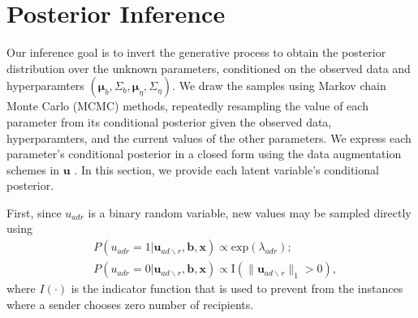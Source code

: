\documentclass[12pt]{article}
\begin{document}
\section{Posterior Inference}\label{sec:inference}
Our inference goal is to invert the generative process to obtain the posterior distribution over the unknown parameters, conditioned on the observed data and hyperparamters $(\boldsymbol{\mu}_b, \Sigma_b, \boldsymbol{\mu}_\eta, \Sigma_\eta)$. We draw the samples using Markov chain Monte Carlo (MCMC) methods, repeatedly resampling the value of each parameter from its conditional posterior given the observed data, hyperparamters, and the current values of the other parameters. We express each parameter’s conditional posterior in a closed form using the data augmentation schemes in $\boldsymbol{u}$ \cite{tanner1987calculation}. In this section, we provide each latent variable's conditional posterior. 

First, since $u_{adr}$ is a binary random variable, new values may be sampled directly using
\begin{equation}
\begin{aligned}
&P(u_{adr}=1| \boldsymbol{u}_{ad\backslash r}, \boldsymbol{b}, \boldsymbol{x})
\propto \mbox{exp}(\lambda_{adr});\\
&P(u_{adr}=0| \boldsymbol{u}_{ad\backslash r},\boldsymbol{b}, \boldsymbol{x})\propto \text{I}(\lVert\boldsymbol{u}_{ad\backslash r}\rVert_1 > 0 ),
\end{aligned}
\label{eqn:latentreceiver}
\end{equation}
where $I(\cdot)$ is the indicator function that is used to prevent from the instances where a sender chooses zero number of recipients.
\end{document}

